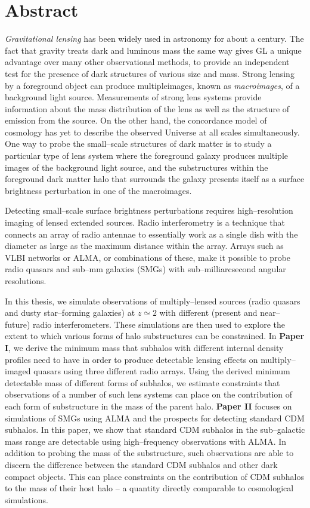 \documentclass[a4wide,12pt]{book}
\begin{document}
\clearpage

\chapter*{Abstract}
\thispagestyle{empty}
{\small \emph{Gravitational lensing} has been widely used in astronomy for about a century. The fact that gravity treats dark and luminous mass the same way gives GL a unique advantage over many other observational methods, to provide an independent test for the presence of dark structures of various size and mass. Strong lensing by a foreground object can produce multipleimages, known as \emph{macroimages}, of a background light source. Measurements of strong lens systems provide information about the mass distribution of the lens as well as the structure of emission from the source. On the other hand, the concordance model of cosmology has yet to describe the observed Universe at all scales simultaneously. One way to probe the small--scale structures of dark matter is to study a particular type of lens system where the foreground galaxy produces multiple images of the background light source, and the substructures within the foreground dark matter halo that surrounds the galaxy presents itself as a surface brightness perturbation in one of the macroimages.

Detecting small--scale surface brightness perturbations requires high--resolution imaging of lensed extended sources. Radio interferometry is a technique that connects an array of radio antennae to essentially work as a single dish with the diameter as large as the maximum distance within the array. Arrays such as VLBI networks or ALMA, or combinations of these, make it possible to probe radio quasars and sub--mm galaxies (SMGs) with sub--milliarcsecond angular resolutions.

In this thesis, we simulate observations of multiply--lensed sources (radio quasars and dusty star--forming galaxies) at $z \simeq 2$ with different (present and near--future) radio interferometers. These simulations are then used to explore the extent to which various forms of halo substructures can be constrained. In {\bf Paper I}, we derive the minimum  mass that subhalos with different internal density profiles need to have in order to produce detectable lensing effects on multiply--imaged quasars using three different radio arrays. Using the derived minimum detectable mass of different forms of subhalos, we estimate constraints that observations of a number of such lens systems can place on the contribution of each form of substructure in the mass of the parent halo. {\bf Paper II} focuses on simulations of SMGs using ALMA and the prospects for detecting standard CDM subhalos. In this paper, we show that standard CDM subhalos in the sub--galactic mass range are detectable using high--frequency observations with ALMA. In addition to probing the mass of the substructure, such observations are able to discern the difference between the standard CDM subhalos and other dark compact objects.  This can place constraints on the contribution of CDM subhalos to the mass of their host halo -- a quantity directly comparable to cosmological simulations.}
\end{document}
